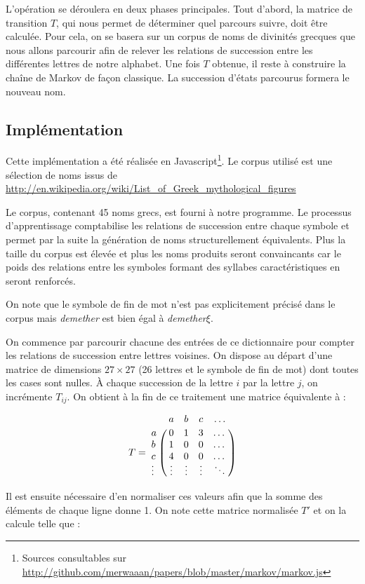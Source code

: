 \documentclass[12pt]{article}
\begin{document}
L'opération se déroulera en deux phases principales. Tout d'abord, la
matrice de transition $T$, qui nous permet de déterminer quel parcours
suivre, doit être calculée. Pour cela, on se basera sur un corpus de
noms de divinités grecques que nous allons parcourir afin de relever
les relations de succession entre les différentes lettres de notre
alphabet. Une fois $T$ obtenue, il reste à construire la chaîne de
Markov de façon classique. La succession d'états parcourus formera le
nouveau nom.

\subsection{Implémentation}

Cette implémentation a été réalisée en Javascript\footnote{Sources
  consultables sur
  \url{http://github.com/merwaaan/papers/blob/master/markov/markov.js}}. Le
corpus utilisé est une sélection de noms issus de
\url{http://en.wikipedia.org/wiki/List_of_Greek_mythological_figures}

Le corpus, contenant 45 noms grecs, est fourni à notre programme. Le
processus d'apprentissage comptabilise les relations de succession
entre chaque symbole et permet par la suite la génération de noms
structurellement équivalents. Plus la taille du corpus est élevée et
plus les noms produits seront convaincants car le poids des relations
entre les symboles formant des syllabes caractéristiques en seront
renforcés.



On note que le symbole de fin de mot n'est pas explicitement précisé
dans le corpus mais \textit{demether} est bien égal à
\textit{demether}$\xi$.

On commence par parcourir chacune des entrées de ce dictionnaire pour
compter les relations de succession entre lettres voisines. On dispose
au départ d'une matrice de dimensions $27 \times 27$ (26 lettres et le
symbole de fin de mot) dont toutes les cases sont nulles. \`A chaque
succession de la lettre $i$ par la lettre $j$, on incrémente
$T_{ij}$. On obtient à la fin de ce traitement une matrice équivalente
à :

$$
T = \bordermatrix{
    & a & b & c & \dots \cr
  a & 0 & 1 & 3 & \dots \cr
  b & 1 & 0 & 0 & \dots \cr
  c & 4 & 0 & 0 & \dots \cr
  \vdots & \vdots & \vdots & \vdots & \ddots \cr
}
$$
\vspace{0.5cm}

Il est ensuite nécessaire d'en normaliser ces valeurs afin que la
somme des éléments de chaque ligne donne 1. On note cette matrice
normalisée $T'$ et on la calcule telle que :
\end{document}

